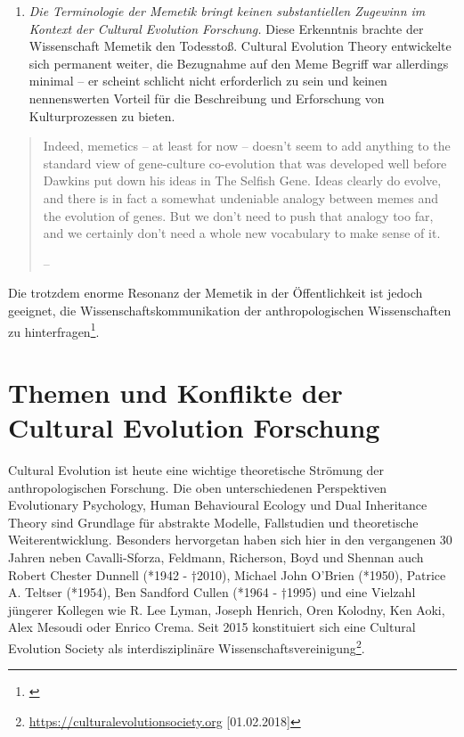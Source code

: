 \documentclass[openany,twoside,twocolumn]{book}
\providecommand{\tightlist}{%
  \setlength{\itemsep}{0pt}\setlength{\parskip}{0pt}}
\let\rmarkdownfootnote\footnote%
\def\footnote{\protect\rmarkdownfootnote}
\begin{document}
\begin{enumerate}
\def\labelenumi{\arabic{enumi}.}
\setcounter{enumi}{2}
\tightlist
\item
  \emph{Die Terminologie der Memetik bringt keinen substantiellen
  Zugewinn im Kontext der Cultural Evolution Forschung.} Diese
  Erkenntnis brachte der Wissenschaft Memetik den Todesstoß. Cultural
  Evolution Theory entwickelte sich permanent weiter, die Bezugnahme auf
  den Meme Begriff war allerdings minimal -- er scheint schlicht nicht
  erforderlich zu sein und keinen nennenswerten Vorteil für die
  Beschreibung und Erforschung von Kulturprozessen zu bieten.
\end{enumerate}

\begin{quote}
Indeed, memetics -- at least for now -- doesn't seem to add anything to
the standard view of gene-culture co-evolution that was developed well
before Dawkins put down his ideas in The Selfish Gene. Ideas clearly do
evolve, and there is in fact a somewhat undeniable analogy between memes
and the evolution of genes. But we don't need to push that analogy too
far, and we certainly don't need a whole new vocabulary to make sense of
it.

-- \textcite{pigliucci_trouble_2007}
\end{quote}

Die trotzdem enorme Resonanz der Memetik in der Öffentlichkeit ist
jedoch geeignet, die Wissenschaftskommunikation der anthropologischen
Wissenschaften zu hinterfragen\footnote{\textcite{bloch_where_2005}}.

\hypertarget{themen-und-konflikte-der-cultural-evolution-forschung}{%
\section{Themen und Konflikte der Cultural Evolution
Forschung}\label{themen-und-konflikte-der-cultural-evolution-forschung}}

Cultural Evolution ist heute eine wichtige theoretische Strömung der
anthropologischen Forschung. Die oben unterschiedenen Perspektiven
Evolutionary Psychology, Human Behavioural Ecology und Dual Inheritance
Theory sind Grundlage für abstrakte Modelle, Fallstudien und
theoretische Weiterentwicklung. Besonders hervorgetan haben sich hier in
den vergangenen 30 Jahren neben Cavalli-Sforza, Feldmann, Richerson,
Boyd und Shennan auch Robert Chester Dunnell (*1942 - †2010), Michael
John O'Brien (*1950), Patrice A. Teltser (*1954), Ben Sandford Cullen
(*1964 - †1995) und eine Vielzahl jüngerer Kollegen wie R. Lee Lyman,
Joseph Henrich, Oren Kolodny, Ken Aoki, Alex Mesoudi oder Enrico Crema.
Seit 2015 konstituiert sich eine Cultural Evolution Society als
interdisziplinäre Wissenschaftsvereinigung\footnote{\url{https://culturalevolutionsociety.org}
  {[}01.02.2018{]}}.
\end{document}
